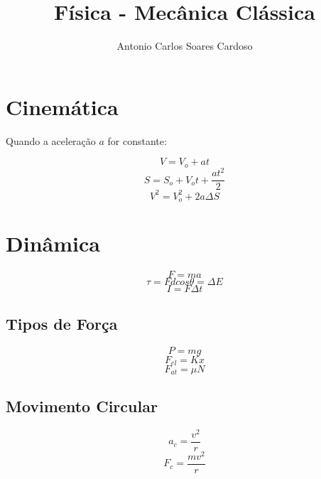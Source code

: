 \documentclass[
    12pt, %
    openright,
    twoside, %
    a4paper, %
    article,
    english,brazil %
]{abntex2}
\author{Antonio Carlos Soares Cardoso}
\title{Física - Mecânica Clássica}
\makeatletter
\renewcommand\tableofcontents{%
  \null\hfill\textbf{\Large\contentsname}\hfill\null\par
  \@mkboth{\MakeUppercase\contentsname}{\MakeUppercase\contentsname}%
  \@starttoc{toc}%
}
\makeatother
\begin{document}
\tableofcontents

\newpage

\textual

\section{Cinemática}

Quando a aceleração $a$ for constante: 

$$V = V_o + at$$ 
$$S = S_o + V_ot + \frac{at^2}{2}$$
$$V^2 = V_o^2 + 2a\Delta S$$

\section{Dinâmica}

$$F = ma$$
$$\tau = Fdcos\theta = \Delta E$$
$$I = F\Delta t$$

\subsection{Tipos de Força} 

$$P = mg$$
$$F_{el} = Kx$$
$$F_{at} = \mu N$$

\subsection{Movimento Circular}

$$a_c = \frac{v^2}{r}$$
$$F_c = \frac{mv^2}{r}$$
\end{document}
